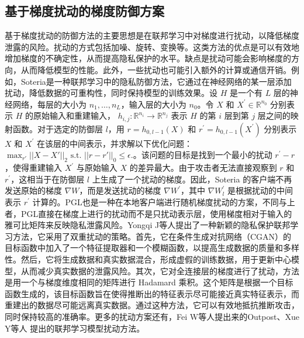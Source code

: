 \subsection{基于梯度扰动的梯度防御方案}

基于梯度扰动的防御方法的主要思想是在联邦学习中对梯度进行扰动，以降低梯度泄露的风险。扰动的方式包括加噪、旋转、变换等。这类方法的优点是可以有效地增加梯度的不确定性，从而提高隐私保护的水平。缺点是扰动可能会影响梯度的方向，从而降低模型的性能。此外，一些扰动也可能引入额外的计算或通信开销。例如，Soteria\cite{Soteria}是一种联邦学习中的隐私防御方法，它通过在神经网络的某一层添加扰动，降低数据的可重构性，同时保持模型的训练效果。设 $H$ 是一个有 $L$ 层的神经网络，每层的大小为 $n_1,\ldots,n_L$，输入层的大小为 $n_0$。令 $X$ 和 $X^{\prime}\in\mathbb{R}^{n_0}$ 分别表示 $H$ 的原始输入和重建输入， $h_{i,j}: \mathbb{R} ^{n_i}\to \mathbb{R} ^{n_j}$ 表示 $H$ 的第 $i$ 层到第 $j$ 层之间的映射函数。对于选定的防御层 $l$，用 $r= h_{0, l- 1}( X) $ 和 $r^{\prime}= h_{0, l- 1}( X^{\prime})$ 分别表示 $X$ 和 $X^{\prime}$ 在该层的中间表示，并求解以下优化问题：$\max_{r'}||X-X'||_2\text{ s.t. }||r-r'||_0\leq\epsilon.$。该问题的目标是找到一个最小的扰动 $r^{\prime}-r$，使得重建输入 $X^{\prime}$ 与原始输入 $X$ 的差异最大。由于攻击者无法直接观察到 $r$ 和 $r^{\prime}$，这相当于在防御层 $l$ 上生成了一个扰动的梯度。因此，Soteria 的客户端不再发送原始的梯度 $\nabla W$，而是发送扰动的梯度 $\nabla W^{\prime}$，其中 $\nabla W_l^{\prime}$ 是根据扰动的中间表示 $r^{\prime}$ 计算的。PGL\cite{Protect_Privacy_from_Gradient_Leakage_Attack_in_Federated_Learning}也是一种在本地客户端进行随机梯度扰动的方案，不同与上者，PGL直接在梯度上进行的扰动而不是只扰动表示层，使用梯度相对于输入的雅可比矩阵来反映隐私泄露风险。Yongqi J等人\cite{Directional_Privacy_for_Deep_Learning}提出了一种新颖的隐私保护联邦学习方法，它采用了双重扰动的策略。首先，它在条件生成对抗网络（CGAN）的目标函数中加入了一个特征提取器和一个模糊函数，以提高生成数据的质量和多样性。然后，它将生成数据和真实数据混合，形成虚假的训练数据，用于更新中心模型，从而减少真实数据的泄露风险。其次，它对全连接层的梯度进行了扰动，方法是用一个与梯度维度相同的矩阵进行 Hadamard 乘积。这个矩阵是根据一个目标函数生成的，该目标函数旨在使得推断出的特征表示尽可能接近真实特征表示，而重建出的数据尽可能远离真实数据。通过这种方法，它可以有效地抵抗推断攻击，同时保持较高的准确率。更多的扰动方案还有，Fei W等人\cite{More_than_Enough_is_Too_Much_Adaptive_Defenses_against_Gradient_Leakage_in_Production_Federated_Learning}提出来的Outpost、Xue Y等人\cite{An_Accuracy-Lossless_Perturbation_Method_for_Defending_Privacy_Attacks_in_Federated_Learning} 提出的联邦学习模型扰动方法。

